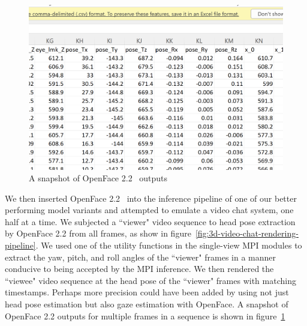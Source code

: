 \begin{figure}[!h]
    \includegraphics[width=0.75\columnwidth]{figures/openface-csv.png}
    \caption{A snapshot of OpenFace 2.2~\cite{baltrusaitis_openface_2018} outputs}
    \label{fig:openface-outputs}
\end{figure}

We then inserted OpenFace 2.2~\cite{baltrusaitis_openface_2018} into the inference pipeline of one of our better performing model variants and attempted to emulate a video chat system, one half at a time. We subjected a ``viewer" video sequence to head pose extraction by OpenFace 2.2 from all frames, as show in figure~\ref{fig:3d-video-chat-rendering-pipeline}. We used one of the utility functions in the single-view MPI modules to extract the yaw, pitch, and roll angles of the ``viewer" frames in a manner conducive to being accepted by the MPI inference. We then rendered the ``viewee" video sequence at the head pose of the ``viewer" frames with matching timestamps. Perhaps more precision could have been added by using not just head pose estimation but also gaze estimation with OpenFace. A snapshot of OpenFace 2.2 outputs for multiple frames in a sequence is shown in figure~\ref{fig:openface-outputs}